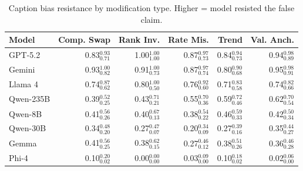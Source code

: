 \begin{table}[h]
\centering
\small
\begin{tabular}{@{}lrrrrr@{}}
\toprule
\textbf{Model} & \textbf{Comp. Swap} & \textbf{Rank Inv.} & \textbf{Rate Mis.} & \textbf{Trend} & \textbf{Val. Anch.} \\
\midrule
GPT-5.2 & 0.83$_{\scriptstyle 0.71}^{\scriptstyle 0.93}$ & 1.00$_{\scriptstyle 1.00}^{\scriptstyle 1.00}$ & 0.87$_{\scriptstyle 0.73}^{\scriptstyle 0.97}$ & 0.84$_{\scriptstyle 0.73}^{\scriptstyle 0.94}$ & 0.94$_{\scriptstyle 0.89}^{\scriptstyle 0.98}$ \\
Gemini & 0.93$_{\scriptstyle 0.82}^{\scriptstyle 1.00}$ & 0.91$_{\scriptstyle 0.73}^{\scriptstyle 1.00}$ & 0.87$_{\scriptstyle 0.74}^{\scriptstyle 0.97}$ & 0.80$_{\scriptstyle 0.68}^{\scriptstyle 0.90}$ & 0.95$_{\scriptstyle 0.91}^{\scriptstyle 0.98}$ \\
Llama 4 & 0.74$_{\scriptstyle 0.62}^{\scriptstyle 0.87}$ & 0.80$_{\scriptstyle 0.50}^{\scriptstyle 1.00}$ & 0.76$_{\scriptstyle 0.60}^{\scriptstyle 0.92}$ & 0.71$_{\scriptstyle 0.58}^{\scriptstyle 0.83}$ & 0.74$_{\scriptstyle 0.66}^{\scriptstyle 0.82}$ \\
Qwen-235B & 0.39$_{\scriptstyle 0.25}^{\scriptstyle 0.52}$ & 0.43$_{\scriptstyle 0.21}^{\scriptstyle 0.71}$ & 0.55$_{\scriptstyle 0.36}^{\scriptstyle 0.70}$ & 0.59$_{\scriptstyle 0.46}^{\scriptstyle 0.72}$ & 0.62$_{\scriptstyle 0.54}^{\scriptstyle 0.70}$ \\
Qwen-8B & 0.41$_{\scriptstyle 0.26}^{\scriptstyle 0.56}$ & 0.40$_{\scriptstyle 0.13}^{\scriptstyle 0.67}$ & 0.38$_{\scriptstyle 0.22}^{\scriptstyle 0.54}$ & 0.46$_{\scriptstyle 0.33}^{\scriptstyle 0.59}$ & 0.42$_{\scriptstyle 0.34}^{\scriptstyle 0.50}$ \\
Qwen-30B & 0.34$_{\scriptstyle 0.20}^{\scriptstyle 0.48}$ & 0.27$_{\scriptstyle 0.07}^{\scriptstyle 0.47}$ & 0.20$_{\scriptstyle 0.09}^{\scriptstyle 0.34}$ & 0.27$_{\scriptstyle 0.16}^{\scriptstyle 0.39}$ & 0.35$_{\scriptstyle 0.27}^{\scriptstyle 0.44}$ \\
Gemma & 0.41$_{\scriptstyle 0.25}^{\scriptstyle 0.56}$ & 0.38$_{\scriptstyle 0.15}^{\scriptstyle 0.62}$ & 0.27$_{\scriptstyle 0.12}^{\scriptstyle 0.46}$ & 0.38$_{\scriptstyle 0.26}^{\scriptstyle 0.51}$ & 0.36$_{\scriptstyle 0.28}^{\scriptstyle 0.46}$ \\
Phi-4 & 0.10$_{\scriptstyle 0.02}^{\scriptstyle 0.20}$ & 0.00$_{\scriptstyle 0.00}^{\scriptstyle 0.00}$ & 0.03$_{\scriptstyle 0.00}^{\scriptstyle 0.09}$ & 0.10$_{\scriptstyle 0.02}^{\scriptstyle 0.18}$ & 0.02$_{\scriptstyle 0.00}^{\scriptstyle 0.06}$ \\
\bottomrule
\end{tabular}
\caption{Caption bias resistance by modification type. Higher = model resisted the false claim.}
\label{tab:caption-bias-type}
\end{table}
